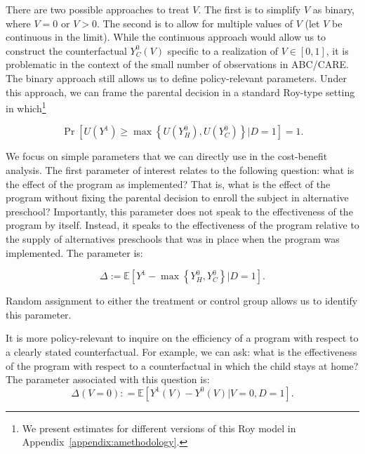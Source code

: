 There are two possible approaches to treat $V$. The first is to simplify $V$ as binary, where $V = 0$ or $V  > 0$. The second is to allow for multiple values of $V$ (let $V$ be continuous in the limit). While the continuous approach would allow us to construct the counterfactual $Y_C^0 \left( V \right)$ specific to a realization of $V \in [0,1]$, it is problematic in the context of the small number of observations in ABC/CARE. The binary approach still allows us to define policy-relevant parameters. Under this approach, we can frame the parental decision in a standard Roy-type setting in which\footnote{We present estimates for different versions of this Roy model in Appendix~\ref{appendix:amethodology}.}

\begin{equation}
\Pr \left[ U \left(Y^1 \right) \geq  \max \left\{ U \left(  Y_{H}^0 \right),  U\left(Y_{C}^0 \right) \right\} \vert D =  1\right] = 1.
\label{eq:noutility}
\end{equation}

We focus on simple parameters that we can directly use in the cost-benefit analysis. The first parameter of interest relates to the following question: what is the effect of the program as implemented? That is, what is the effect of the program without fixing the parental decision to enroll the subject in alternative preschool? Importantly, this parameter does not speak to the effectiveness of the program by itself. Instead, it speaks to the effectiveness of the program relative to the supply of alternatives preschools that was in place when the program was implemented. The parameter is:

\begin{equation}
\Delta := \mathbb{E} \left[ Y^1 -  \max \left\{ Y_{H}^0,  Y_{C}^0 \right\} | D =1 \right]. \label{eq:mainest}
\end{equation}

\noindent Random assignment to either the treatment or control group allows us to identify this parameter.

It is more policy-relevant to inquire on the efficiency of a program with respect to a clearly stated counterfactual. For example, we can ask: what is the effectiveness of the program with respect to a counterfactual in which the child stays at home? The parameter associated with this question is:
\begin{equation}
\Delta \left(V = 0 \right) : =   \mathbb{E} \left[ Y^1 \left( V \right) - Y^0 \left( V \right) | V = 0, D = 1 \right]. \label{eq:par0}
\end{equation}

